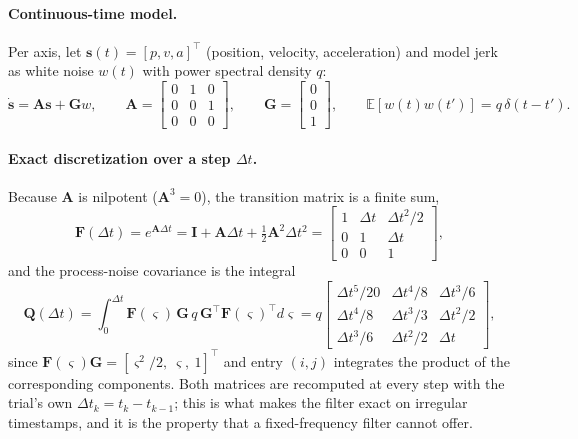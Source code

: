 \documentclass[11pt,a4paper]{article}
\begin{document}
\paragraph{Continuous-time model.} Per axis, let
$\bm{s}(t) = [p, v, a]^{\!\top}$ (position, velocity, acceleration) and model
jerk as white noise $w(t)$ with power spectral density $q$:
\begin{equation}
  \dot{\bm{s}} = \bm{A}\bm{s} + \bm{G}w,
  \qquad
  \bm{A} = \begin{bmatrix} 0&1&0\\ 0&0&1\\ 0&0&0 \end{bmatrix},
  \qquad
  \bm{G} = \begin{bmatrix} 0\\0\\1 \end{bmatrix},
  \qquad
  \mathbb{E}[w(t)w(t')] = q\,\delta(t-t').
  \label{eq:ctmodel}
\end{equation}

\paragraph{Exact discretization over a step $\Delta t$.} Because $\bm{A}$ is
nilpotent ($\bm{A}^3 = 0$), the transition matrix is a finite sum,
\begin{equation}
  \bm{F}(\Delta t) = e^{\bm{A}\Delta t}
  = \bm{I} + \bm{A}\Delta t + \tfrac12 \bm{A}^2 \Delta t^2
  = \begin{bmatrix}
      1 & \Delta t & \Delta t^2/2\\
      0 & 1        & \Delta t\\
      0 & 0        & 1
    \end{bmatrix},
  \label{eq:F}
\end{equation}
and the process-noise covariance is the integral
\begin{equation}
  \bm{Q}(\Delta t) = \int_0^{\Delta t} \bm{F}(\varsigma)\,\bm{G}\,q\,\bm{G}^{\!\top}\bm{F}(\varsigma)^{\!\top} d\varsigma
  = q \begin{bmatrix}
      \Delta t^5/20 & \Delta t^4/8 & \Delta t^3/6\\
      \Delta t^4/8  & \Delta t^3/3 & \Delta t^2/2\\
      \Delta t^3/6  & \Delta t^2/2 & \Delta t
    \end{bmatrix},
  \label{eq:Q}
\end{equation}
since $\bm{F}(\varsigma)\bm{G} = [\varsigma^2/2,\ \varsigma,\ 1]^{\!\top}$ and
entry $(i,j)$ integrates the product of the corresponding components. Both
matrices are recomputed at every step with the trial's own
$\Delta t_k = t_k - t_{k-1}$; this is what makes the filter exact on irregular
timestamps, and it is the property that a fixed-frequency filter cannot offer.
\end{document}

